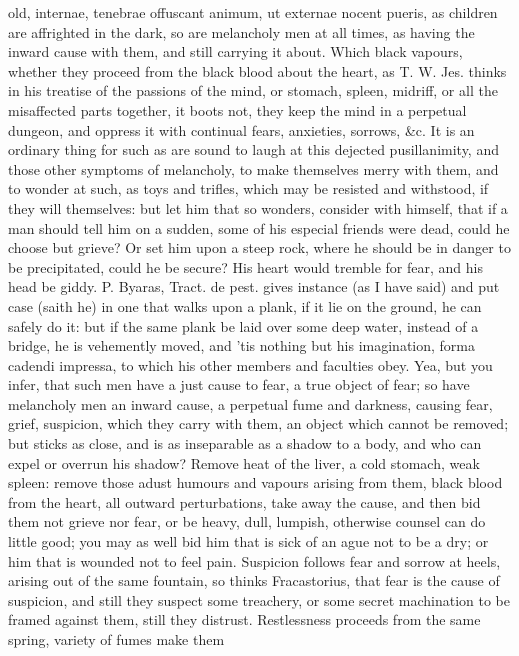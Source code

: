 {old, internae, tenebrae offuscant animum, ut externae nocent pueris, as
children are affrighted in the dark, so are melancholy men at all
times, as having the inward cause with them, and still carrying
it about. Which black vapours, whether they proceed from the black
blood about the heart, as T. W. Jes. thinks in his treatise of the
passions of the mind, or stomach, spleen, midriff, or all the
misaffected parts together, it boots not, they keep the mind in a
perpetual dungeon, and oppress it with continual fears, anxieties,
sorrows, \&c. It is an ordinary thing for such as are sound to laugh at
this dejected pusillanimity, and those other symptoms of melancholy, to
make themselves merry with them, and to wonder at such, as toys and
trifles, which may be resisted and withstood, if they will themselves:
but let him that so wonders, consider with himself, that if a man
should tell him on a sudden, some of his especial friends were dead,
could he choose but grieve? Or set him upon a steep rock, where he
should be in danger to be precipitated, could he be secure? His heart
would tremble for fear, and his head be giddy. P. Byaras, Tract. de
pest. gives instance (as I have said) and put case (saith he) in
one that walks upon a plank, if it lie on the ground, he can safely do
it: but if the same plank be laid over some deep water, instead of a
bridge, he is vehemently moved, and 'tis nothing but his imagination,
forma cadendi impressa, to which his other members and faculties obey.
Yea, but you infer, that such men have a just cause to fear, a true
object of fear; so have melancholy men an inward cause, a perpetual
fume and darkness, causing fear, grief, suspicion, which they carry
with them, an object which cannot be removed; but sticks as close, and
is as inseparable as a shadow to a body, and who can expel or overrun
his shadow? Remove heat of the liver, a cold stomach, weak spleen:
remove those adust humours and vapours arising from them, black blood
from the heart, all outward perturbations, take away the cause, and
then bid them not grieve nor fear, or be heavy, dull, lumpish,
otherwise counsel can do little good; you may as well bid him that is
sick of an ague not to be a dry; or him that is wounded not to feel
pain.
Suspicion follows fear and sorrow at heels, arising out of the same
fountain, so thinks Fracastorius, that fear is the cause of
suspicion, and still they suspect some treachery, or some secret
machination to be framed against them, still they distrust.
Restlessness proceeds from the same spring, variety of fumes make them
}
